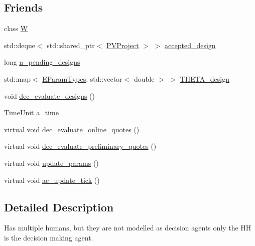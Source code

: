 \subsection*{Friends}
\begin{DoxyCompactItemize}
\item 
class \hyperlink{classsolar__core_1_1_household_a44ca6974a1749c689f90065d1232facd}{W}
\end{DoxyCompactItemize}
\begin{DoxyCompactItemize}
\item 
std\+::deque$<$ std\+::shared\+\_\+ptr$<$ \hyperlink{classsolar__core_1_1_p_v_project}{P\+V\+Project} $>$ $>$ \hyperlink{classsolar__core_1_1_household_ad4409e81251bdd33d9dca1cd1225dc75}{accepted\+\_\+design}
\item 
long \hyperlink{classsolar__core_1_1_household_ac82a6ebca38ecaf971845f6fa5791559}{n\+\_\+pending\+\_\+designs}
\item 
std\+::map$<$ \hyperlink{namespacesolar__core_aa1147341e5ef7a40d68d1bd68e149362}{E\+Param\+Types}, std\+::vector$<$ double $>$ $>$ \hyperlink{classsolar__core_1_1_household_a7c0f5fb9f84a1d971e770fc677e7d8de}{T\+H\+E\+T\+A\+\_\+design}
\item 
void \hyperlink{classsolar__core_1_1_household_aaa1f1e52009d8aef32d3c5a9367b93b7}{dec\+\_\+evaluate\+\_\+designs} ()
\end{DoxyCompactItemize}
\begin{DoxyCompactItemize}
\item 
\hyperlink{namespacesolar__core_a4b5949d07259da6f8a20d12a30403e90}{Time\+Unit} \hyperlink{classsolar__core_1_1_household_ad323100235079f34537ccda656e86e64}{a\+\_\+time}
\item 
virtual void \hyperlink{classsolar__core_1_1_household_a2d8c80f6db68610fb3e0f9b48e1e490b}{dec\+\_\+evaluate\+\_\+online\+\_\+quotes} ()
\item 
virtual void \hyperlink{classsolar__core_1_1_household_a6e27e36f623bd307eedcd97c550d5c5e}{dec\+\_\+evaluate\+\_\+preliminary\+\_\+quotes} ()
\item 
virtual void \hyperlink{classsolar__core_1_1_household_a733a90456d57f698b3aa974c6c6e0108}{update\+\_\+params} ()
\item 
virtual void \hyperlink{classsolar__core_1_1_household_ac73de13d0d4b4e01b2defbb85872c4b2}{ac\+\_\+update\+\_\+tick} ()
\end{DoxyCompactItemize}


\subsection{Detailed Description}
Has multiple humans, but they are not modelled as decision agents only the H\+H is the decision making agent.

